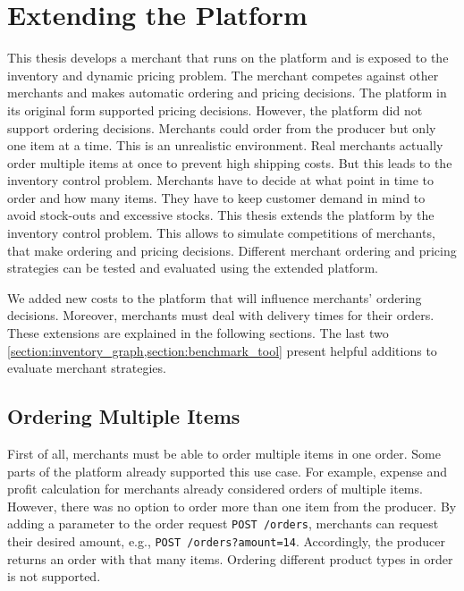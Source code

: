 
\chapter{Extending the \pricewars Platform}
\label{section:platform_extension}

This thesis develops a merchant that runs on the \pricewars platform and is exposed to the inventory and dynamic pricing problem.
The merchant competes against other merchants and makes automatic ordering and pricing decisions.
The platform in its original form supported pricing decisions.
However, the platform did not support ordering decisions.
Merchants could order from the producer but only one item at a time.
This is an unrealistic environment.
Real merchants actually order multiple items at once to prevent high shipping costs.
But this leads to the inventory control problem.
Merchants have to decide at what point in time to order and how many items.
They have to keep customer demand in mind to avoid stock-outs and excessive stocks.
This thesis extends the \pricewars platform by the inventory control problem.
This allows to simulate competitions of merchants, that make ordering and pricing decisions.
Different merchant ordering and pricing strategies can be tested and evaluated using the extended platform.

We added new costs to the platform that will influence merchants' ordering decisions.
Moreover, merchants must deal with delivery times for their orders.
These extensions are explained in the following sections.
The last two \cref{section:inventory_graph,section:benchmark_tool} present helpful additions to evaluate merchant strategies.

\section{Ordering Multiple Items}
\label{section:multiple_items}
First of all, merchants must be able to order multiple items in one order.
Some parts of the platform already supported this use case.
For example, expense and profit calculation for merchants already considered orders of multiple items.
However, there was no option to order more than one item from the producer.
By adding a parameter to the order request \texttt{POST /orders}, merchants can request their desired amount, e.g., \texttt{POST /orders?amount=14}.
Accordingly, the producer returns an order with that many items.
Ordering different product types in order is not supported.

